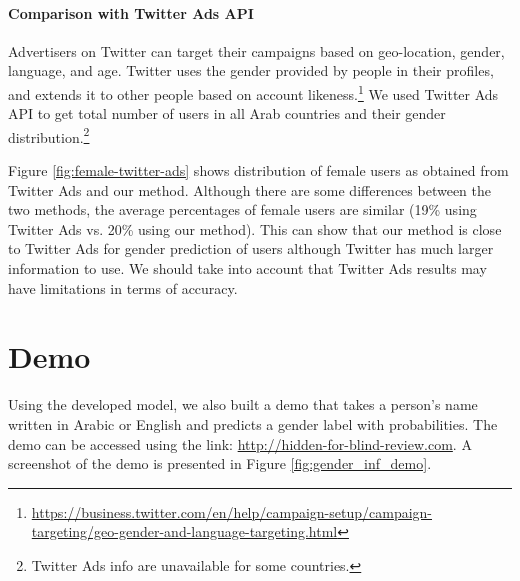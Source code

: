 \documentclass[sigconf,authorversion,nonacm]{acmart}
\begin{document}
\paragraph{\textbf{Comparison with Twitter Ads API}}
\label{sec:comparison}
Advertisers on Twitter can target their campaigns based on geo-location, gender, language, and age. Twitter uses the gender provided by people in their profiles, and extends it to other people based on account likeness.\footnote{ \url{https://business.twitter.com/en/help/campaign-setup/campaign-targeting/geo-gender-and-language-targeting.html}} We used Twitter Ads API to get total number of users in all Arab countries and their gender distribution.\footnote{Twitter Ads info are unavailable for some countries.}

Figure \ref{fig:female-twitter-ads} shows  distribution of female users as obtained from Twitter Ads and our method. Although there are some differences between the two methods, the average percentages of female users are similar (19\% using Twitter Ads vs. 20\% using our method). This can show that our method is close to Twitter Ads for gender prediction of users although Twitter has much larger information to use. We should take into account that Twitter Ads results may have limitations in terms of accuracy. %




\section{Demo} 
\label{sec:demo}
Using the developed model, we also built a demo that takes a person's name written in Arabic or English and predicts a gender label with probabilities. 
The demo can be accessed using the link: \url{http://hidden-for-blind-review.com}. A screenshot of the demo is presented in Figure \ref{fig:gender_inf_demo}.
\end{document}
